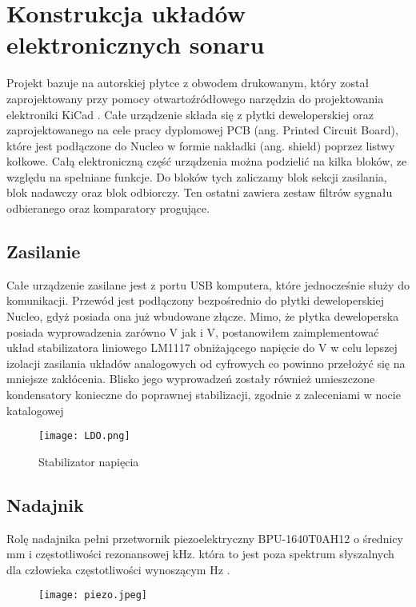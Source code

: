 \section{Konstrukcja układów elektronicznych sonaru}
Projekt bazuje na autorskiej płytce z obwodem drukowanym, który został zaprojektowany przy pomocy 
otwartoźródłowego narzędzia do projektowania elektroniki KiCad \cite{kicad}. 
Całe urządzenie składa się z płytki deweloperskiej oraz zaprojektowanego na cele pracy dyplomowej 
PCB (ang. Printed Circuit Board), które
jest podłączone do Nucleo w formie nakładki (ang. shield) poprzez listwy kołkowe.
Całą elektroniczną część urządzenia można podzielić na kilka bloków, ze względu na spełniane funkcje. 
Do bloków tych zaliczamy blok sekcji zasilania, blok nadawczy oraz blok odbiorczy. Ten ostatni zawiera zestaw filtrów sygnału odbieranego oraz komparatory progujące.

\subsection{Zasilanie}
Całe urządzenie zasilane jest z portu USB komputera, które jednocześnie służy do komunikacji. 
Przewód jest podłączony bezpośrednio do płytki deweloperskiej Nucleo, gdyż posiada ona już wbudowane złącze. 
Mimo, że płytka deweloperska posiada wyprowadzenia zarówno \unit[5]{V} jak i \unit[3,3]{V}, 
postanowiłem zaimplementować układ stabilizatora liniowego LM1117 obniżającego napięcie do \unit[3,3]{V} w celu lepszej izolacji 
zasilania układów analogowych od cyfrowych co powinno przełożyć się na mniejsze zakłócenia. 
Blisko jego wyprowadzeń zostały również umieszczone kondensatory konieczne do poprawnej stabilizacji, zgodnie z zaleceniami w nocie katalogowej \cite{ti:lm1117}
\begin{figure}[ht!]
    \centering
    \texttt{[image: LDO.png]}
    \caption{Stabilizator napięcia}
    \label{fig:ldo}
\end{figure}

\subsection{Nadajnik}
Rolę nadajnika pełni przetwornik piezoelektryczny BPU-1640T0AH12  o średnicy \unit[16]{mm} i częstotliwości rezonansowej \unit[40]{kHz}. 
która to jest poza spektrum słyszalnych dla człowieka częstotliwości wynoszącym \unit[16-20 000]{Hz} \cite{sluch}.
\begin{figure}[ht!]
    \centering
    \texttt{[image: piezo.jpeg]}
    \label{fig:piezo}
\end{figure}


